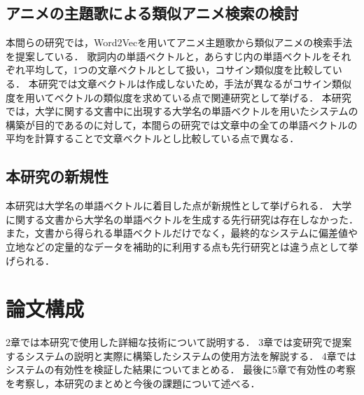 \subsection{アニメの主題歌による類似アニメ検索の検討}
本間ら\cite{thesis2}の研究では，Word2Vecを用いてアニメ主題歌から類似アニメの検索手法を提案している．
歌詞内の単語ベクトルと，あらすじ内の単語ベクトルをそれぞれ平均して，1つの文章ベクトルとして扱い，コサイン類似度を比較している．
本研究では文章ベクトルは作成しないため，手法が異なるがコサイン類似度を用いてベクトルの類似度を求めている点で関連研究として挙げる．
本研究では，大学に関する文書中に出現する大学名の単語ベクトルを用いたシステムの構築が目的であるのに対して，本間らの研究では文章中の全ての単語ベクトルの平均を計算することで文章ベクトルとし比較している点で異なる．

\subsection{本研究の新規性}
本研究は大学名の単語ベクトルに着目した点が新規性として挙げられる．
大学に関する文書から大学名の単語ベクトルを生成する先行研究は存在しなかった．
また，文書から得られる単語ベクトルだけでなく，最終的なシステムに偏差値や立地などの定量的なデータを補助的に利用する点も先行研究とは違う点として挙げられる．

\section{論文構成}
2章では本研究で使用した詳細な技術について説明する．
3章では変研究で提案するシステムの説明と実際に構築したシステムの使用方法を解説する．
4章ではシステムの有効性を検証した結果についてまとめる．
最後に5章で有効性の考察を考察し，本研究のまとめと今後の課題について述べる．